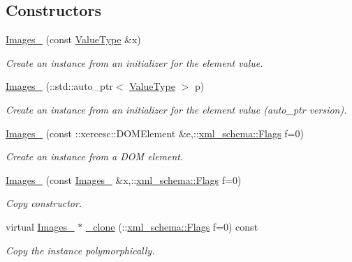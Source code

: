 \subsection*{Constructors}
\begin{DoxyCompactItemize}
\item 
\hyperlink{classopenstack_1_1xml_1_1Images___ad236e7d77e660041fd32338e39bba159}{Images\_\-} (const \hyperlink{classopenstack_1_1xml_1_1Images}{ValueType} \&x)
\begin{DoxyCompactList}\small\item\em Create an instance from an initializer for the element value. \item\end{DoxyCompactList}\item 
\hyperlink{classopenstack_1_1xml_1_1Images___a403f00646027cf67ee576885e7385efb}{Images\_\-} (::std::auto\_\-ptr$<$ \hyperlink{classopenstack_1_1xml_1_1Images}{ValueType} $>$ p)
\begin{DoxyCompactList}\small\item\em Create an instance from an initializer for the element value (auto\_\-ptr version). \item\end{DoxyCompactList}\item 
\hyperlink{classopenstack_1_1xml_1_1Images___a945cbd0ffa0f5380e6aabc7d74bf033e}{Images\_\-} (const ::xercesc::DOMElement \&e,::\hyperlink{namespacexml__schema_affb4c227cbd9aa7453dd1dc5a1401943}{xml\_\-schema::Flags} f=0)
\begin{DoxyCompactList}\small\item\em Create an instance from a DOM element. \item\end{DoxyCompactList}\item 
\hyperlink{classopenstack_1_1xml_1_1Images___a8345014e8fe522308b33e83da8445971}{Images\_\-} (const \hyperlink{classopenstack_1_1xml_1_1Images__}{Images\_\-} \&x,::\hyperlink{namespacexml__schema_affb4c227cbd9aa7453dd1dc5a1401943}{xml\_\-schema::Flags} f=0)
\begin{DoxyCompactList}\small\item\em Copy constructor. \item\end{DoxyCompactList}\item 
virtual \hyperlink{classopenstack_1_1xml_1_1Images__}{Images\_\-} $\ast$ \hyperlink{classopenstack_1_1xml_1_1Images___a6214752e31f2ca4abbc181fa586bbe69}{\_\-clone} (::\hyperlink{namespacexml__schema_affb4c227cbd9aa7453dd1dc5a1401943}{xml\_\-schema::Flags} f=0) const 
\begin{DoxyCompactList}\small\item\em Copy the instance polymorphically. \item\end{DoxyCompactList}\end{DoxyCompactItemize}
